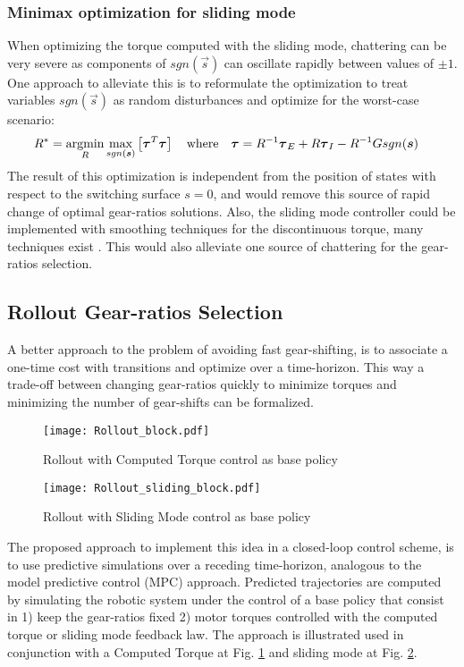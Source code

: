 \subsubsection{Minimax optimization for sliding mode}
\label{sec:minimax}

When optimizing the torque computed with the sliding mode, chattering can be very severe as components of $sgn( \vec{s} )$ can oscillate rapidly between values of $\pm1$. One approach to alleviate this is to reformulate the optimization to treat variables $sgn( \vec{s} )$ as random disturbances and optimize for the worst-case scenario:
%
\begin{align}
R^{*} &= \operatornamewithlimits{argmin}\limits_{R} \operatornamewithlimits{max}\limits_{sgn(\vec{s})} \left[ \vec{\tau}^T\vec{\tau}  \right] \quad\text{where}\quad \vec{\tau} = R^{-1} \vec{\tau}_{E} + R \vec{\tau}_{I} - R^{-1} G sgn( \vec{s} ) 
\end{align} 
%
The result of this optimization is independent from the position of states with respect to the switching surface $s=0$, and would remove this source of rapid change of optimal gear-ratios solutions. Also, the sliding mode controller could be implemented with smoothing techniques for the discontinuous torque, many techniques exist \cite{slotine_applied_1991} \cite{perruquetti_sliding_2002}. This would also alleviate one source of chattering for the gear-ratios selection.

\subsection{Rollout Gear-ratios Selection}

A better approach to the problem of avoiding fast gear-shifting, is to associate a one-time cost with transitions and optimize over a time-horizon. This way a trade-off between changing gear-ratios quickly to minimize torques and minimizing the number of gear-shifts can be formalized.
%
\begin{figure}[tp]
	\centering
		\texttt{[image: Rollout\_block.pdf]}
	\caption{Rollout with Computed Torque control as base policy}
	\label{fig:Rollout_block}
\end{figure}
%
\begin{figure}[tp]
	\centering
		\texttt{[image: Rollout\_sliding\_block.pdf]}
	\caption{Rollout with Sliding Mode control as base policy}
	\label{fig:Rollout_sliding_block}
\end{figure}
%
The proposed approach to implement this idea in a closed-loop control scheme, is to use predictive simulations over a receding time-horizon, analogous to the model predictive control (MPC) approach. Predicted trajectories are computed by simulating the robotic system under the control of a base policy that consist in 1) keep the gear-ratios fixed 2) motor torques controlled with the computed torque or sliding mode feedback law.  The approach is illustrated used in conjunction with a Computed Torque at Fig. \ref{fig:Rollout_block} and sliding mode at Fig. \ref{fig:Rollout_sliding_block}.

